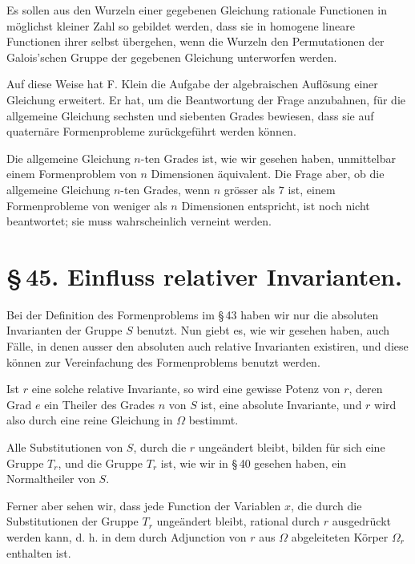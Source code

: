 \documentclass[11pt]{article}
\begin{document}
Es sollen aus den Wurzeln einer gegebenen Gleichung rationale Functionen in möglichst kleiner Zahl so gebildet werden, dass sie in homogene lineare Functionen ihrer selbst übergehen, wenn die Wurzeln den Permutationen der Galois'schen Gruppe der gegebenen Gleichung unterworfen werden.

Auf diese Weise hat F. Klein die Aufgabe der algebraischen Auflösung einer Gleichung erweitert. Er hat, um die Beantwortung der Frage anzubahnen, für die allgemeine Gleichung sechsten und siebenten Grades bewiesen, dass sie auf quaternäre Formenprobleme zurückgeführt werden können.

Die allgemeine Gleichung $n$-ten Grades ist, wie wir gesehen haben, unmittelbar einem Formenproblem von $n$ Dimensionen äquivalent. Die Frage aber, ob die allgemeine Gleichung $n$-ten Grades, wenn $n$ grösser als $7$ ist, einem Formenprobleme von weniger als $n$ Dimensionen entspricht, ist noch nicht beantwortet; sie muss wahrscheinlich verneint werden.

\section*{\S\,45. Einfluss relativer Invarianten.}

Bei der Definition des Formenproblems im \S\,43 haben wir nur die absoluten Invarianten der Gruppe $S$ benutzt. Nun giebt es, wie wir gesehen haben, auch Fälle, in denen ausser den absoluten auch relative Invarianten existiren, und diese können zur Vereinfachung des Formenproblems benutzt werden.

Ist $r$ eine solche relative Invariante, so wird eine gewisse Potenz von $r$, deren Grad $e$ ein Theiler des Grades $n$ von $S$ ist, eine absolute Invariante, und $r$ wird also durch eine reine Gleichung in $\Omega$ bestimmt.

Alle Substitutionen von $S$, durch die $r$ ungeändert bleibt, bilden für sich eine Gruppe $T_r$, und die Gruppe $T_r$ ist, wie wir in \S\,40 gesehen haben, ein Normaltheiler von $S$.

Ferner aber sehen wir, dass jede Function der Variablen $x$, die durch die Substitutionen der Gruppe $T_r$ ungeändert bleibt, rational durch $r$ ausgedrückt werden kann, d. h. in dem durch Adjunction von $r$ aus $\Omega$ abgeleiteten Körper $\Omega_r$ enthalten ist.
\end{document}
